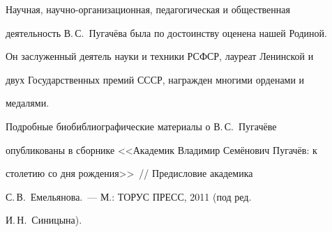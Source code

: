      


     Научная, научно-организационная, педагогическая и общественная 


деятельность В.\,С.~Пугачёва была по достоинству оценена нашей Родиной. 


Он заслуженный деятель науки и техники РСФСР, лауреат Ленинской и 


двух Государственных премий СССР, награжден многими орденами и 


медалями.





\label{end\stat}


     


     Подробные биобиблиографические материалы о В.\,С.~Пугачёве 


опубликованы в сборнике <<Академик Владимир Семёнович Пугачёв: к 


столетию со дня рождения>>~/\!\!/ Предисловие академика 


С.\,В.~Емельянова.~--- М.: ТОРУС ПРЕСС, 2011 (под ред.\ 


И.\,Н.~Синицына).


     


